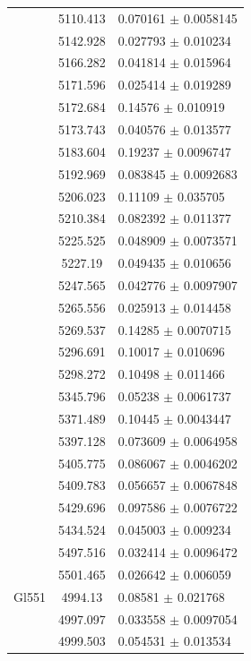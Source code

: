\begin{longtable}{|c|c|l|}
 & 5110.413 & 0.070161 $\pm$ 0.0058145 \\       
 & 5142.928 & 0.027793 $\pm$ 0.010234 \\        
 & 5166.282 & 0.041814 $\pm$ 0.015964 \\        
 & 5171.596 & 0.025414 $\pm$ 0.019289 \\        
 & 5172.684 & 0.14576 $\pm$ 0.010919 \\         
 & 5173.743 & 0.040576 $\pm$ 0.013577 \\        
 & 5183.604 & 0.19237 $\pm$ 0.0096747 \\        
 & 5192.969 & 0.083845 $\pm$ 0.0092683 \\       
 & 5206.023 & 0.11109 $\pm$ 0.035705 \\         
 & 5210.384 & 0.082392 $\pm$ 0.011377 \\        
 & 5225.525 & 0.048909 $\pm$ 0.0073571 \\       
 & 5227.19 & 0.049435 $\pm$ 0.010656 \\         
 & 5247.565 & 0.042776 $\pm$ 0.0097907 \\       
 & 5265.556 & 0.025913 $\pm$ 0.014458 \\        
 & 5269.537 & 0.14285 $\pm$ 0.0070715 \\        
 & 5296.691 & 0.10017 $\pm$ 0.010696 \\         
 & 5298.272 & 0.10498 $\pm$ 0.011466 \\         
 & 5345.796 & 0.05238 $\pm$ 0.0061737 \\        
 & 5371.489 & 0.10445 $\pm$ 0.0043447 \\        
 & 5397.128 & 0.073609 $\pm$ 0.0064958 \\       
 & 5405.775 & 0.086067 $\pm$ 0.0046202 \\       
 & 5409.783 & 0.056657 $\pm$ 0.0067848 \\       
 & 5429.696 & 0.097586 $\pm$ 0.0076722 \\       
 & 5434.524 & 0.045003 $\pm$ 0.009234 \\        
 & 5497.516 & 0.032414 $\pm$ 0.0096472 \\       
 & 5501.465 & 0.026642 $\pm$ 0.006059 \\        
\hline                                          
Gl551 & 4994.13 & 0.08581 $\pm$ 0.021768 \\     
 & 4997.097 & 0.033558 $\pm$ 0.0097054 \\       
 & 4999.503 & 0.054531 $\pm$ 0.013534 \\        

\end{longtable}
